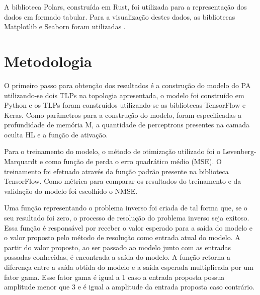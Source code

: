 A biblioteca Polars, construída em Rust, foi utilizada para a representação dos dados em formado tabular. Para a visualização destes dados, as bibliotecas Matplotlib e Seaborn foram utilizadas \cite{Hunter:2007} \cite{Waskom2021}.

\section{Metodologia} \label{sec:estudoi-meto}
O primeiro passo para obtenção dos resultados é a construção do modelo do PA utilizando-se dois TLPs na topologia apresentada, o modelo foi construído em Python e os TLPs foram construídos utilizando-se as bibliotecas TensorFlow e Keras. Como parâmetros para a construção do modelo, foram especificadas a profundidade de memória M, a quantidade de perceptrons presentes na camada oculta HL e a função de ativação.

Para o treinamento do modelo, o método de otimização utilizado foi o Levenberg-Marquardt e como função de perda o erro quadrático médio (MSE). O treinamento foi efetuado através da função padrão presente na biblioteca TensorFlow. Como métrica para comparar os resultados do treinamento e da validação do modelo foi escolhido o NMSE.

Uma função representando o problema inverso foi criada de tal forma que, se o seu resultado foi zero, o processo de resolução do problema inverso seja exitoso. Essa função é responsável por receber o valor esperado para a saída do modelo e o valor proposto pelo método de resolução como entrada atual do modelo. A partir do valor proposto, ao ser passado ao modelo junto com as entradas passadas conhecidas, é encontrada a saída do modelo. A função retorna a diferença entre a saída obtida do modelo e a saída esperada multiplicada por um fator gama. Esse fator gama é igual a 1 caso a entrada proposta possua amplitude menor que 3 e é igual a amplitude da entrada proposta caso contrário.

